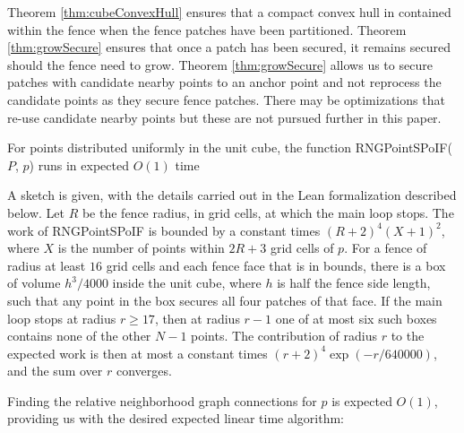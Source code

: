 \documentclass[a4paper,fleqn]{cas-dc}
\begin{document}
Theorem \ref{thm:cubeConvexHull} ensures that a compact convex hull in contained within the fence when the fence
patches have been partitioned.
Theorem \ref{thm:growSecure} ensures that once a patch has been secured, it remains secured
should the fence need to grow.
Theorem \ref{thm:growSecure} allows us to secure patches with candidate nearby points to an anchor point and not
reprocess the candidate points as they secure fence patches.
There may be optimizations that re-use candidate nearby points but these are not pursued further in this paper.





\begin{theorem}
  \label{thm:pspoifO1}
  For points distributed uniformly in the unit cube,
  the function RNGPointSPoIF($P$, $p$) runs in expected $O(1)$ time
\end{theorem}

\begin{pf}
  A sketch is given, with the details carried out in the Lean formalization described below.
  Let $R$ be the fence radius, in grid cells, at which the main loop stops.
  The work of RNGPointSPoIF is bounded by a constant times $(R+2)^4 (X+1)^2$,
  where $X$ is the number of points within $2R+3$ grid cells of $p$.
  For a fence of radius at least $16$ grid cells and each fence face that is in bounds,
  there is a box of volume $h^3 / 4000$ inside the unit cube,
  where $h$ is half the fence side length,
  such that any point in the box secures all four patches of that face.
  If the main loop stops at radius $r \ge 17$, then at radius $r-1$ one of at most six such boxes
  contains none of the other $N-1$ points.
  The contribution of radius $r$ to the expected work is then at most a constant times
  $(r+2)^4 \exp(-r/640000)$, and the sum over $r$ converges.
\end{pf}

  Finding the relative neighborhood graph connections for $p$ is expected $O(1)$,
  providing us with the desired expected linear time algorithm:
\end{document}
